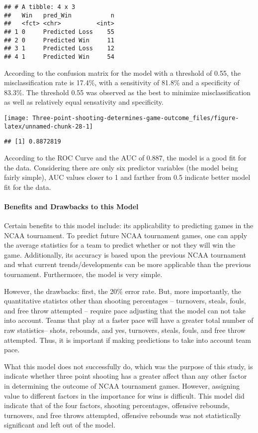 \documentclass[
]{article}
\begin{document}
\begin{verbatim}
## # A tibble: 4 x 3
##   Win   pred_Win           n
##   <fct> <chr>          <int>
## 1 0     Predicted Loss    55
## 2 0     Predicted Win     11
## 3 1     Predicted Loss    12
## 4 1     Predicted Win     54
\end{verbatim}

According to the confusion matrix for the model with a threshold of
0.55, the misclassification rate is 17.4\%, with a sensitivity of 81.8\%
and a specificity of 83.3\%. The threshold 0.55 was observed as the best
to minimize misclassification as well as relatively equal sensativity
and specificity.

\begin{center}\texttt{[image: Three-point-shooting-determines-game-outcome\_files/figure-latex/unnamed-chunk-28-1]} \end{center}

\begin{verbatim}
## [1] 0.8872819
\end{verbatim}

According to the ROC Curve and the AUC of 0.887, the model is a good fit
for the data. Considering there are only six predictor variables (the
model being fairly simple), AUC values closer to 1 and farther from 0.5
indicate better model fit for the data.

\hypertarget{benefits-and-drawbacks-to-this-model}{%
\paragraph{Benefits and Drawbacks to this
Model}\label{benefits-and-drawbacks-to-this-model}}

Certain benefits to this model include: its applicability to predicting
games in the NCAA tournament. To predict future NCAA tournament games,
one can apply the average statistics for a team to predict whether or
not they will win the game. Additionally, its accuracy is based upon the
previous NCAA tournament and what current trends/developments can be
more applicable than the previous tournament. Furthermore, the model is
very simple.

However, the drawbacks: first, the 20\% error rate. But, more
importantly, the quantitative statistcs other than shooting percentages
-- turnovers, steals, fouls, and free throw attempted -- require pace
adjusting that the model can not take into account. Teams that play at a
faster pace will have a greater total number of raw statistics-- shots,
rebounds, and yes, turnovers, steals, fouls, and free throw attempted.
Thus, it is important if making predictions to take into account team
pace.

What this model does not successfully do, which was the purpose of this
study, is indicate whether three point shooting has a greater affect
than any other factor in determining the outcome of NCAA tournament
games. However, assigning value to different factors in the importance
for wins is difficult. This model did indicate that of the four factors,
shooting percentages, offensive rebounds, turnovers, and free throws
attempted, offensive rebounds was not statistically significant and left
out of the model.
\end{document}
